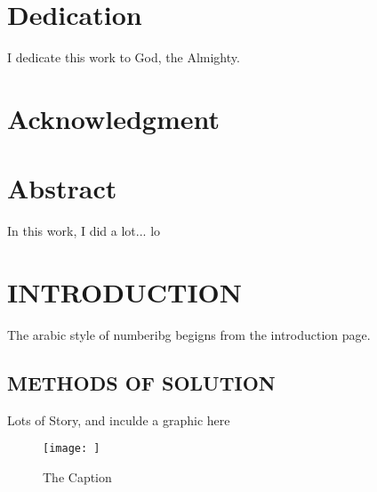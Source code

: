 \documentclass[12pt]{report}
\begin{document}
	\chapter*{Dedication}
	\begin{center}
		I dedicate this work to God, the Almighty.
	\end{center}
	
	\chapter*{Acknowledgment}
	
	
	\chapter*{Abstract}
	
	In this work, I did a lot... lo
	
	\tableofcontents
	
	\listoftables
	
	\listoffigures
	
	\chapter{INTRODUCTION}
	The arabic style of numberibg begigns from the introduction page.
	
	\section{METHODS OF SOLUTION}
	Lots of Story, and inculde a graphic here
	\\
	\begin{figure}[H]
		\centering
		\texttt{[image: ]} 
		\caption{The Caption}
		\label{solutions}
	\end{figure}
	
\end{document}
